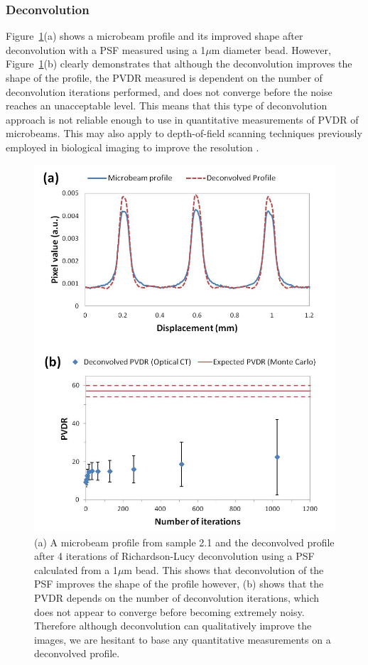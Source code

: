 	
	
	\subsubsection{Deconvolution}
	Figure~\ref{fig:Fig8}(a) shows a microbeam profile and its improved shape after deconvolution with a PSF measured using a 1$\mu$m diameter bead. However, Figure~\ref{fig:Fig8}(b) clearly demonstrates that although the deconvolution improves the shape of the profile, the PVDR measured is dependent on the number of deconvolution iterations performed, and does not converge before the noise reaches an unacceptable level. This means that this type of deconvolution approach is not reliable enough to use in quantitative measurements of PVDR of microbeams. This may also apply to depth-of-field scanning techniques previously employed in biological imaging to improve the resolution \cite{fauverthree-dimensional2005}. 
	
	\begin{figure}
		\centering
		\includegraphics[width=0.85\linewidth]{mrt_img/mrt_Fig8}
		\caption{(a) A microbeam profile from sample 2.1 and the deconvolved profile after 4 iterations of Richardson-Lucy deconvolution using a PSF calculated from a 1$\mu$m bead. This shows that deconvolution of the PSF improves the shape of the profile however, (b) shows that the PVDR depends on the number of deconvolution iterations, which does not appear to converge before becoming extremely noisy. Therefore although deconvolution can qualitatively improve the images, we are hesitant to base any quantitative measurements on a deconvolved profile.}
		\label{fig:Fig8}
	\end{figure}
	
